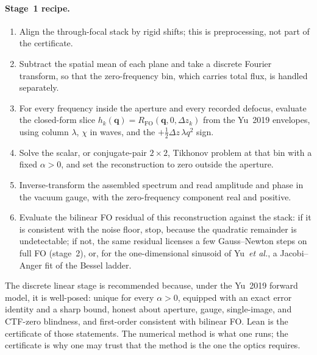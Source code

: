 \paragraph{Stage~1 recipe.}
\begin{enumerate}
\item
  Align the through-focal stack by rigid shifts; this is
  preprocessing, not part of the certificate.
\item
  Subtract the spatial mean of each plane and take a discrete Fourier
  transform, so that the zero-frequency bin, which carries total flux,
  is handled separately.
\item
  For every frequency inside the aperture and every recorded defocus,
  evaluate the closed-form slice
  $h_k(\mathbf{q})=R_{\mathrm{FO}}(\mathbf{q},0,\Delta z_k)$ from the
  Yu~2019 envelopes, using column $\lambda$, $\chi$ in waves, and the
  $+\tfrac12\Delta z\,\lambda q^2$ sign.
\item
  Solve the scalar, or conjugate-pair $2\times 2$, Tikhonov problem at
  that bin with a fixed $\alpha>0$, and set the reconstruction to zero
  outside the aperture.
\item
  Inverse-transform the assembled spectrum and read amplitude and phase
  in the vacuum gauge, with the zero-frequency component real and
  positive.
\item
  Evaluate the bilinear FO residual of this reconstruction against the
  stack: if it is consistent with the noise floor, stop, because the
  quadratic remainder is undetectable; if not, the same residual
  licenses a few Gauss--Newton steps on full FO (stage~2), or, for the
  one-dimensional sinusoid of Yu~\emph{et al.}, a Jacobi--Anger fit of
  the Bessel ladder.
\end{enumerate}

The discrete linear stage is recommended because, under the Yu~2019
forward model, it is well-posed: unique for every $\alpha>0$, equipped
with an exact error identity and a sharp bound, honest about aperture,
gauge, single-image, and CTF-zero blindness, and first-order consistent
with bilinear FO.
Lean is the certificate of those statements.
The numerical method is what one runs; the certificate is why one may
trust that the method is the one the optics requires.

%
